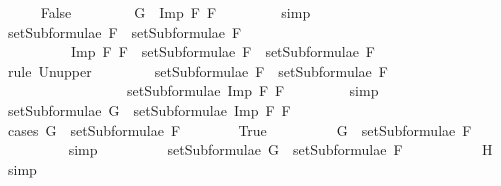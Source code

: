 \begin{isabellebody}
\isanewline
\ \ \ \ \isamarkupfalse%
\ False\isanewline
\ \ \ \ \isamarkupfalse%
\ \isamarkupfalse%
\ {}{\isacharcolon}\ {\isachardoublequoteopen}G\ {\isasymnoteq}\ Imp\ F{}\ F{}{\isachardoublequoteclose}\ \isanewline
\ \ \ \ \ \ \isamarkupfalse%
\ simp\isanewline
\ \ \ \ \isamarkupfalse%
\ {\isachardoublequoteopen}setSubformulae\ F{}\ {\isasymunion}\ setSubformulae\ F{}\ {\isasymsubseteq}\ \isanewline
\ \ \ \ \ \ \ \ \ \ {\isacharbraceleft}Imp\ F{}\ F{}{\isacharbraceright}\ {\isasymunion}\ {\isacharparenleft}setSubformulae\ F{}\ {\isasymunion}\ setSubformulae\ F{}{\isacharparenright}{\isachardoublequoteclose}\ \isanewline
\ \ \ \ \ \ \isamarkupfalse%
\ {\isacharparenleft}rule\ Un{\isacharunderscore}upper{}{\isacharparenright}\isanewline
\ \ \ \ \isamarkupfalse%
\ \isamarkupfalse%
\ {}{\isacharcolon}\ {\isachardoublequoteopen}setSubformulae\ F{}\ {\isasymunion}\ setSubformulae\ F{}\ {\isasymsubseteq}\ \isanewline
\ \ \ \ \ \ \ \ \ \ \ \ \ \ \ \ \ \ setSubformulae\ {\isacharparenleft}Imp\ F{}\ F{}{\isacharparenright}{\isachardoublequoteclose}\ \isanewline
\ \ \ \ \ \ \isamarkupfalse%
\ simp\isanewline
\ \ \ \ \isamarkupfalse%
\ \isamarkupfalse%
\ {\isachardoublequoteopen}setSubformulae\ G\ {\isasymsubseteq}\ setSubformulae\ {\isacharparenleft}Imp\ F{}\ F{}{\isacharparenright}{\isachardoublequoteclose}\isanewline
\ \ \ \ \isamarkupfalse%
\ {\isacharparenleft}cases\ {\isachardoublequoteopen}G\ {\isasymin}\ setSubformulae\ F{}{\isachardoublequoteclose}{\isacharparenright}\isanewline
\ \ \ \ \ \ \isamarkupfalse%
\ True\isanewline
\ \ \ \ \ \ \isamarkupfalse%
\ \isamarkupfalse%
\ {\isachardoublequoteopen}G\ {\isasymin}\ setSubformulae\ F{}{\isachardoublequoteclose}\ \isanewline
\ \ \ \ \ \ \ \ \isamarkupfalse%
\ simp\isanewline
\ \ \ \ \ \ \isamarkupfalse%
\ \isamarkupfalse%
\ {}{\isacharcolon}{\isachardoublequoteopen}setSubformulae\ G\ {\isasymsubseteq}\ setSubformulae\ F{}{\isachardoublequoteclose}\ \isanewline
\ \ \ \ \ \ \ \ \isamarkupfalse%
\ H{}\ \isamarkupfalse%
\ simp\isanewline

\end{isabellebody}
